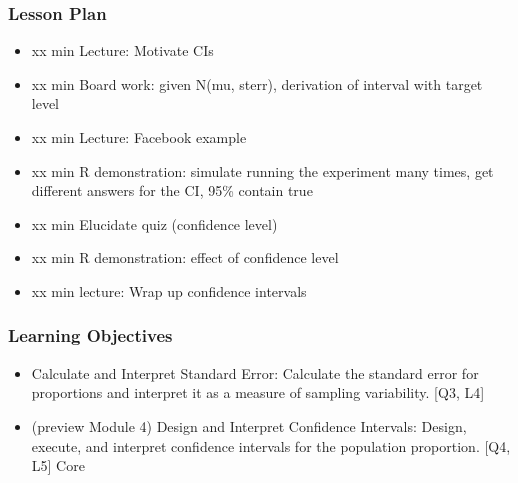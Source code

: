 

\begin{frame}
\frametitle{Lesson Plan}
\begin{itemize}
    \item xx min Lecture: Motivate CIs
    \item xx min Board work: given N(mu, sterr), derivation of interval with target level
    \item xx min Lecture: Facebook example
    \item xx min R demonstration: simulate running the experiment many times, get different answers for the CI, 95\% contain true
    \item xx min Elucidate quiz (confidence level)
    \item xx min R demonstration: effect of confidence level
    \item xx min lecture: Wrap up confidence intervals
\end{itemize}
\end{frame}
        
\begin{frame}
\frametitle{Learning Objectives}
\begin{itemize}
    \item Calculate and Interpret Standard Error: Calculate the standard error for proportions and interpret it as a measure of sampling variability. [Q3, L4]
    \item (preview Module 4) Design and Interpret Confidence Intervals: Design, execute, and interpret confidence intervals for the population proportion. [Q4, L5] Core 
\end{itemize}
\end{frame}


